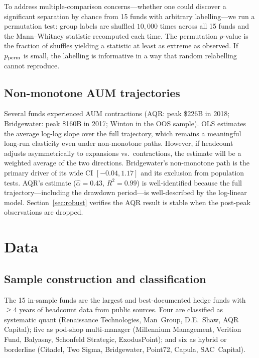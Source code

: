 \documentclass[10pt,onecolumn]{article}
\newcommand{\alphahat}{\hat{\alpha}}
\begin{document}
To address multiple-comparison concerns---whether one could
discover a significant separation by chance from 15 funds with
arbitrary labelling---we run a permutation test: group labels
are shuffled $10{,}000$ times across all 15 funds and the
Mann--Whitney statistic recomputed each time.
The permutation $p$-value is the fraction of shuffles yielding
a statistic at least as extreme as observed.
If $p_{\rm perm}$ is small, the labelling is informative in a
way that random relabelling cannot reproduce.

\subsection{Non-monotone AUM trajectories}

Several funds experienced AUM contractions (AQR: peak \$226B in 2018;
Bridgewater: peak \$160B in 2017; Winton in the OOS sample).
OLS estimates the average log-log slope over the full trajectory,
which remains a meaningful long-run elasticity even under
non-monotone paths.
However, if headcount adjusts asymmetrically to expansions vs.\
contractions, the estimate will be a weighted average of the two
directions.
Bridgewater's non-monotone path is the primary driver of its
wide CI $[-0.04, 1.17]$ and its exclusion from population tests.
AQR's estimate ($\alphahat = 0.43$, $R^2 = 0.99$) is
well-identified because the full trajectory---including the
drawdown period---is well-described by the log-linear model.
Section~\ref{sec:robust} verifies the AQR result is stable
when the post-peak observations are dropped.


\section{\label{sec:data}Data}

\subsection{Sample construction and classification}

The 15 in-sample funds are the largest and best-documented hedge
funds with $\geq 4$ years of headcount data from public sources.
Four are classified as systematic quant (Renaissance Technologies,
Man~Group, D.E.~Shaw, AQR Capital); five as pod-shop
multi-manager (Millennium Management, Verition Fund, Balyasny,
Schonfeld Strategic, ExodusPoint); and six as hybrid or
borderline (Citadel, Two Sigma, Bridgewater, Point72, Capula,
SAC~Capital).
\end{document}
